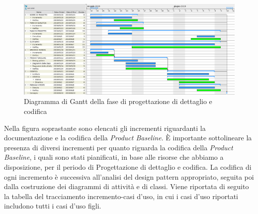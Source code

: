 \begin{figure}[H]
	\includegraphics[width=0.99\linewidth]{res/images/gantt_pd.png}
	\caption{Diagramma di Gantt della fase di progettazione di dettaglio e codifica}
\end{figure}

Nella figura soprastante sono elencati gli incrementi riguardanti la documentazione e la codifica della \textit{Product Baseline}\glo.
È importante sottolineare la presenza di diversi incrementi per quanto riguarda la codifica della \textit{Product Baseline}, i quali sono stati pianificati, in base alle risorse che abbiamo a disposizione, per il periodo di Progettazione di dettaglio e codifica.
La codifica di ogni incremento è successiva all'analisi del design pattern appropriato, seguita poi dalla costruzione dei diagrammi di attività e di classi.
Viene riportata di seguito la tabella del tracciamento incremento-casi d’uso, in cui i casi d’uso riportati includono tutti i casi d’uso figli.

